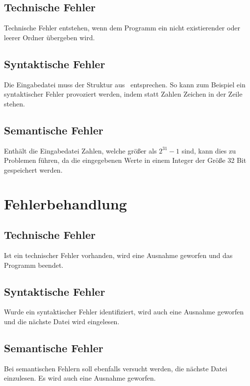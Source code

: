 \subsection{Technische Fehler}\label{subsec:technische-fehler}
Technische Fehler entstehen, wenn dem Programm ein nicht existierender oder leerer Ordner übergeben wird.

\subsection{Syntaktische Fehler}\label{subsec:syntaktische-fehler}
Die Eingabedatei muss der Struktur aus~ entsprechen.
So kann zum Beispiel ein syntaktischer Fehler provoziert werden, indem statt Zahlen Zeichen in der Zeile stehen.

\subsection{Semantische Fehler}\label{subsec:semantische-fehler}
Enthält die Eingabedatei Zahlen, welche größer als $2^{31} -1$ sind, kann dies zu Problemen führen, da die eingegebenen Werte in einem Integer der Größe 32 Bit gespeichert werden.


\section{Fehlerbehandlung}\label{sec:fehlerbehandlung}

\subsection{Technische Fehler}\label{subsec:technische-fehler-behandlung}
Ist ein technischer Fehler vorhanden, wird eine Ausnahme geworfen und das Programm beendet.

\subsection{Syntaktische Fehler}\label{subsec:syntaktische-fehler-behandlung}
Wurde ein syntaktischer Fehler identifiziert, wird auch eine Ausnahme geworfen und die nächste Datei wird eingelesen.

\subsection{Semantische Fehler}\label{subsec:semantische-fehler-behandlung}
Bei semantischen Fehlern soll ebenfalls versucht werden, die nächste Datei einzulesen.
Es wird auch eine Ausnahme geworfen.

